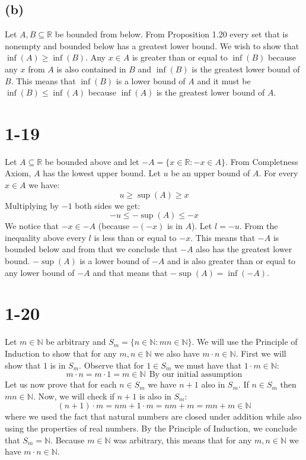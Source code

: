 \documentclass{article}
\begin{document}
\subsection*{(b)}
Let \(A, B \subseteq \mathbb{R}\) be bounded from below. From Proposition 1.20 every set that is nonempty and bounded below has
a greatest lower bound. We wish to show that \(\inf(A) \geq \inf(B)\). Any \(x \in A\) is greater than or equal to \(\inf(B)\) 
because any \(x\) from \(A\) is also contained in \(B\) and \(\inf(B)\) is the greatest lower bound of \(B\). This means
that \(\inf(B)\) is a lower bound of \(A\) and it must be \(\inf(B) \leq \inf(A)\) because \(\inf(A)\) is the 
greatest lower bound of \(A\).

\newpage
\section*{1-19}
Let \(A \subseteq \mathbb{R}\) be bounded above and let \(-A = \{x \in \mathbb{R}: -x \in A\}\).
From Completness Axiom, \(A\) has the lowest upper bound. Let \(u\)
be an upper bound of \(A\). For every \(x \in A\) we have:
\begin{equation*}
    u \geq \sup(A) \geq x
\end{equation*}
Multiplying by \(-1\) both sides we get:
\begin{equation*}
    -u \leq - \sup(A) \leq -x
\end{equation*}
We notice that \(-x \in -A\) (because \(-(-x)\) is in \(A\)). Let \(l = -u\). From the inequality above
every \(l\) is less than or equal to \(-x\). This means that \(-A\) is bounded below and from that we conclude
that \(-A\) also has the greatest lower bound. \(- \sup(A)\) is a lower bound of \(-A\) and is also greater
than or equal to any lower bound of \(-A\) and that means that \(- \sup(A) = \inf(-A)\).

\section*{1-20}
Let \(m \in \mathbb{N}\) be arbitrary and \(S_m = \{n \in \mathbb{N} : mn \in \mathbb{N}\}\). We will use the Principle of 
Induction to show that for any \(m, n \in \mathbb{N}\) we also have \(m \cdot n \in \mathbb{N}\). First we will show that
\(1\) is in \(S_m\). Observe that for \(1 \in S_m\) we must have that \(1 \cdot m \in \mathbb{N}\):
\begin{equation*}
    m \cdot n = m \cdot 1 = m \in \mathbb{N} \ \ \mbox{By our initial assumption}
\end{equation*}
Let us now prove that for each \(n \in S_m\) we have \(n + 1\) also in \(S_m\). If \(n \in S_m\) then \(mn \in \mathbb{N}\).
Now, we will check if \(n + 1\) is also in \(S_m\):
\begin{equation*}
    (n + 1) \cdot m = nm + 1 \cdot m = nm + m = mn + m \in \mathbb{N}
\end{equation*} 
where we used the fact that natural numbers are closed under addition while also using the properties of real numbers.
By the Principle of Induction, we conclude that \(S_m = \mathbb{N}\). Because \(m \in \mathbb{N}\) was arbitrary, this means
that for any \(m, n \in \mathbb{N}\) we have \(m \cdot n \in \mathbb{N}\).
\end{document}
